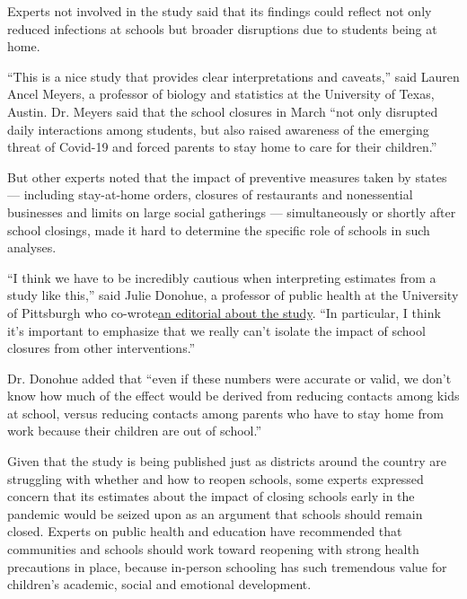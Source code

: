 Experts not involved in the study said that its findings could reflect
not only reduced infections at schools but broader disruptions due to
students being at home.

``This is a nice study that provides clear interpretations and
caveats,'' said Lauren Ancel Meyers, a professor of biology and
statistics at the University of Texas, Austin. Dr. Meyers said that the
school closures in March ``not only disrupted daily interactions among
students, but also raised awareness of the emerging threat of Covid-19
and forced parents to stay home to care for their children.''

But other experts noted that the impact of preventive measures taken by
states --- including stay-at-home orders, closures of restaurants and
nonessential businesses and limits on large social gatherings ---
simultaneously or shortly after school closings, made it hard to
determine the specific role of schools in such analyses.

``I think we have to be incredibly cautious when interpreting estimates
from a study like this,'' said Julie Donohue, a professor of public
health at the University of Pittsburgh who
co-wrote\href{https://jamanetwork.com/journals/jama/fullarticle/10.1001/jama.2020.13092}{an
editorial about the study}. ``In particular, I think it's important to
emphasize that we really can't isolate the impact of school closures
from other interventions.''

Dr. Donohue added that ``even if these numbers were accurate or valid,
we don't know how much of the effect would be derived from reducing
contacts among kids at school, versus reducing contacts among parents
who have to stay home from work because their children are out of
school.''

Given that the study is being published just as districts around the
country are struggling with whether and how to reopen schools, some
experts expressed concern that its estimates about the impact of closing
schools early in the pandemic would be seized upon as an argument that
schools should remain closed. Experts on public health and education
have recommended that communities and schools should work toward
reopening with strong health precautions in place, because in-person
schooling has such tremendous value for children's academic, social and
emotional development.

\href{https://www.nytimes3xbfgragh.onion/news-event/coronavirus?action=click\&pgtype=Article\&state=default\&region=MAIN_CONTENT_3\&context=storylines_faq}{}


